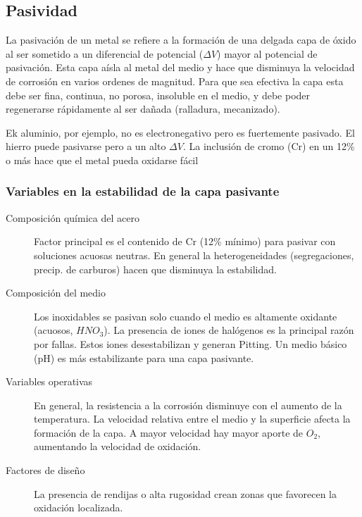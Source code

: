 \documentclass{article}
\begin{document}
\subsection{Pasividad}
La pasivación de un metal se refiere a la formación de una delgada capa de óxido al ser sometido a un diferencial de potencial ($\Delta V$) mayor al potencial de pasivación. Esta capa aísla al metal del medio y hace que disminuya la velocidad de corrosión en varios ordenes de magnitud. Para que sea efectiva la capa esta debe ser fina, continua, no porosa, insoluble en el medio, y debe poder regenerarse rápidamente al ser dañada (ralladura, mecanizado). 

Ek aluminio, por ejemplo, no es electronegativo pero es fuertemente pasivado. El hierro puede pasivarse pero a un alto $\Delta V$. La inclusión de cromo (Cr) en un 12\% o más hace que el metal pueda oxidarse fácil

\subsubsection*{Variables en la estabilidad de la capa pasivante}
\begin{description}
	\item[Composición química del acero] Factor principal es el contenido de Cr (12\% mínimo) para pasivar con soluciones acuosas neutras. En general la heterogeneidades (segregaciones, precip. de carburos) hacen que disminuya la estabilidad.
	\item[Composición del medio] Los inoxidables se pasivan solo cuando el medio es altamente oxidante (acuosos, $HNO_3$). La presencia de iones de halógenos es la principal razón por fallas. Estos iones desestabilizan y generan Pitting. Un medio básico (pH) es más estabilizante para una capa pasivante.
	\item[Variables operativas] En general, la resistencia a la corrosión disminuye con el aumento de la temperatura. La velocidad relativa entre el medio y la superficie afecta la formación de la capa. A mayor velocidad hay mayor aporte de $O_2$, aumentando la velocidad de oxidación.
	\item[Factores de diseño] La presencia de rendijas o alta rugosidad crean zonas que favorecen la oxidación localizada.
\end{description}





\end{document}
